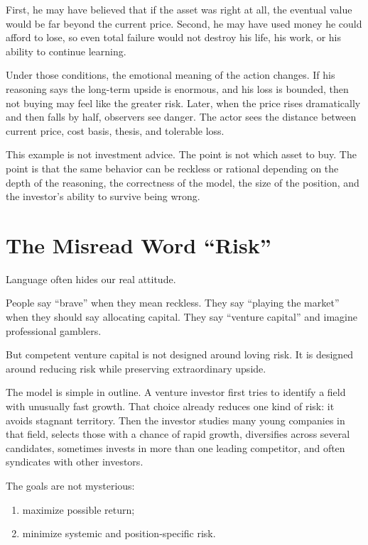 First, he may have believed that if the asset was right at all, the eventual value would be far beyond the current price. Second, he may have used money he could afford to lose, so even total failure would not destroy his life, his work, or his ability to continue learning.

Under those conditions, the emotional meaning of the action changes. If his reasoning says the long-term upside is enormous, and his loss is bounded, then not buying may feel like the greater risk. Later, when the price rises dramatically and then falls by half, observers see danger. The actor sees the distance between current price, cost basis, thesis, and tolerable loss.

This example is not investment advice. The point is not which asset to buy. The point is that the same behavior can be reckless or rational depending on the depth of the reasoning, the correctness of the model, the size of the position, and the investor's ability to survive being wrong.

\section*{The Misread Word ``Risk''}

Language often hides our real attitude.

People say ``brave'' when they mean reckless. They say ``playing the market'' when they should say allocating capital. They say ``venture capital'' and imagine professional gamblers.

But competent venture capital is not designed around loving risk. It is designed around reducing risk while preserving extraordinary upside.

The model is simple in outline. A venture investor first tries to identify a field with unusually fast growth. That choice already reduces one kind of risk: it avoids stagnant territory. Then the investor studies many young companies in that field, selects those with a chance of rapid growth, diversifies across several candidates, sometimes invests in more than one leading competitor, and often syndicates with other investors.

The goals are not mysterious:

\begin{enumerate}
\item maximize possible return;
\item minimize systemic and position-specific risk.
\end{enumerate}

